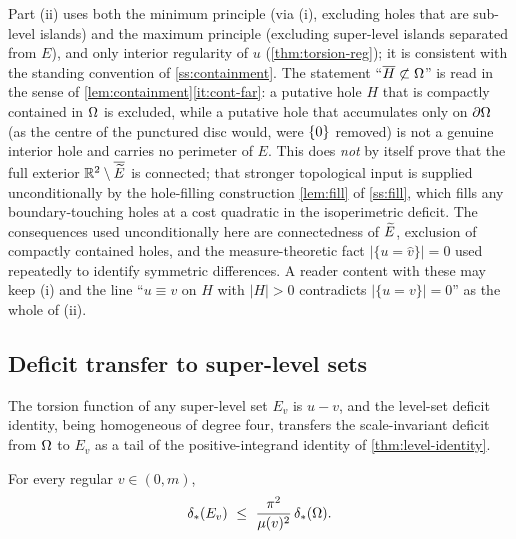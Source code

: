 \begin{remark}
Part (ii) uses both the minimum principle (via (i), excluding holes that are
sub-level islands) and the maximum principle (excluding super-level islands
separated from $E$), and only interior regularity of $u$
(\cref{thm:torsion-reg}); it is consistent with the standing convention of
\cref{ss:containment}. The statement ``$\overline H\not\subset\Omega$'' is read
in the sense of \cref{lem:containment}\ref{it:cont-far}: a putative hole $H$
that is compactly contained in $\Omega$ is excluded, while a putative hole that
accumulates only on $\partial\Omega$ (as the centre of the punctured disc would,
were $\left\{0\right\}$ removed) is not a genuine interior hole and carries no perimeter
of $E$. This does \emph{not} by itself prove that the full exterior
$\mathbb{R}^2\setminus\overline{\widetilde{E}}$ is connected; that stronger topological input is
supplied unconditionally by the hole-filling construction \cref{lem:fill} of
\cref{ss:fill}, which fills any boundary-touching holes at a cost quadratic in
the isoperimetric deficit. The consequences used unconditionally
here are connectedness of $\widetilde{E}$, exclusion of compactly contained holes, and
the measure-theoretic fact $|\{u=\hat v\}|=0$ used repeatedly to identify
symmetric differences. A reader content with these may keep (i) and the line
``$u\equiv v$ on $H$ with $|H|>0$ contradicts $|\{u=v\}|=0$'' as the whole of
(ii).
\end{remark}

\subsection{Deficit transfer to super-level sets}

The torsion function of any super-level set $E_v$ is $u-v$, and the
level-set deficit identity, being homogeneous of degree four, transfers the
scale-invariant deficit from $\Omega$ to $E_v$ as a tail of the
positive-integrand identity of \cref{thm:level-identity}.

\begin{lemma}\label{lem:transfer}
For every regular $v\in(0,m)$,
\begin{equation}\label{eq:transfer}
   \delta_{*}(E_v)\ \le\ \frac{\pi^2}{\mu(v)^2}\,\delta_{*}(\Omega).
\end{equation}
\end{lemma}

